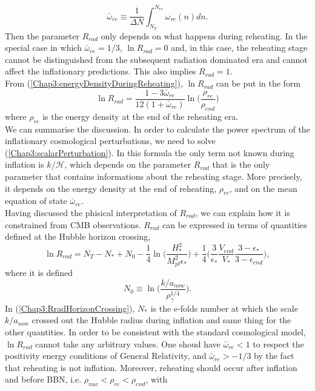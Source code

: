 \documentclass[11pt,a4paper,twoside]{book}
\begin{document}
\begin{equation}
\label{Chap3:meanEqStateParametere}
\bar{\omega}_{re}\equiv \frac{1}{\Delta N}\int_{N_{T}}^{N_{re}}\omega_{re}(n)dn.
\end{equation}
Then the parameter $ R_{rad} $  only depends on what happens during reheating. In the special case  in which $ \bar{\omega}_{re}=1/3 $, $ \ln R_{rad}=0 $ and, in this case, the reheating stage cannot be distinguished from the subsequent radiation dominated era and cannot affect the inflationary predictions. This also implies $ R_{rad}=1 $.\\
From (\ref{Chap3:energyDensityDuringReheating}), $ \ln R_{rad} $ can be put in the form
\begin{equation}
\label{Chap3:Rrad2}
\ln R_{rad}= \frac{1-3\bar{\omega}_{re}}{12(1+\bar{\omega}_{re})}\ln \Bigg ( \frac{\rho_{re}}{\rho_{end}} \Bigg)
\end{equation}
where $ \rho_{re} $ is the energy density at the end of the reheating era. \\
 We can summarise the discussion. In order to calculate the power spectrum of the inflationary cosmological perturbations, we need to solve (\ref{Chap3:scalarPerturbation}). In this formula the only term not known during inflation is $ k/\mathcal{H} $, which depends on the parameter $ R_{rad} $ that is the only parameter that contains informations about the reheating stage. More precisely, it depends on the energy density at the end of reheating, $\rho_{re}$, and on the mean equation of state $\bar{\omega}_{re}$.\\
 Having discussed the phisical interpretation of $ R_{rad} $, we can explain how it is constrained from CMB observations. $ R_{rad} $ can be expressed in terms of quantities defined at the Hubble horizon crossing,
 \begin{equation}
 	\label{Chap3:RradHorizonCrossing}
 	\ln R_{rad} = N_{T} - N_{*} + N_{0} - \frac{1}{4}\ln \Bigg(\frac{H_{*}^{2}}{M_{pl}^{2}\epsilon_{*}}\Bigg) +\frac{1}{4}\Bigg(\frac{3}{\epsilon_{*}}\frac{V_{end}}{V_{*}}\frac{3-\epsilon_{*}}{3-\epsilon_{end}}\Bigg),
 \end{equation}
 where it is defined
 \begin{equation}
\label{Chap3:reheatingN0}
N_{0} \equiv \ln \Bigg(\frac{k/a_{now}}{\rho_{\gamma}^{1/4}}\Bigg).
 \end{equation}
 In (\ref{Chap3:RradHorizonCrossing}),  $ N_{*} $ is the e-folds number at which the scale $ k/a_{now} $ crossed out the Hubble radius during inflation and same thing for the other quantities. In order to be consistent with the standard cosmological model, $ \ln R_{rad} $ cannot take any arbitrary values. One shoud have $\bar{\omega}_{re}<1$ to respect the positivity energy conditions of General Relativity, and $ \bar{\omega}_{re} > -1/3 $ by the fact that reheating is not inflation. Moreover, reheating should occur after inflation and before BBN, i.e. $\rho_{nuc} < \rho_{re} < \rho_{end}$, with
\end{document}
